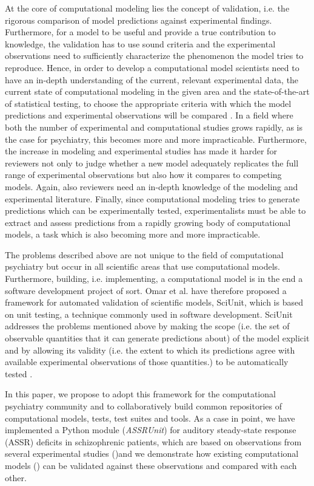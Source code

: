 \documentclass[a4paper,10pt]{article}
\begin{document}
At the core of computational modeling lies the concept of validation, i.e. the rigorous comparison of model predictions 
against experimental findings. Furthermore, for a model to be useful and provide a true contribution to knowledge, the validation has to 
use sound criteria and the experimental observations need to sufficiently characterize the phenomenon the model tries to reproduce.
Hence, in order to develop a computational model scientists need to have an in-depth understanding of the current, relevant experimental data, 
the current state of computational modeling in the given area and the state-of-the-art of statistical testing, to choose the appropriate criteria
with which the model predictions and experimental observations will be compared \cite{Gerkin2013,Sarma2016}. In a field where both the number of experimental 
and computational
studies grows rapidly, as is the case for psychiatry, this becomes more and more impracticable.
Furthermore, the increase in modeling and experimental studies has made it harder for reviewers not only to judge whether a new model adequately 
replicates the full range of experimental observations but also how it compares to competing models. Again, also reviewers need an 
in-depth knowledge of the modeling
and experimental literature.
Finally, since computational modeling tries to generate predictions which can be experimentally tested, experimentalists must be able 
to extract and assess predictions from a rapidly growing body of computational models, a task which is also becoming more and more impracticable.

The problems described above are not unique to the field of computational psychiatry but occur in all scientific areas that use computational models.
Furthermore, building, i.e. implementing, a computational model is in the end a software development project of sort. Omar et al. \cite{Omar2014}
have therefore
proposed a framework for automated validation of scientific models, SciUnit, which is based on unit testing, a technique commonly used in software 
development.
SciUnit addresses the problems mentioned above by making the scope (i.e. the set of observable
quantities that it can generate predictions about) of the model explicit and by allowing its validity (i.e. the extent to which its predictions
agree with available experimental observations of those quantities.) to be automatically tested \cite{Omar2014}.

In this paper, we  propose to adopt this framework for the computational psychiatry community and to collaboratively build
common repositories of computational models, tests, test suites and tools.
As a case in point, we have implemented a Python module (\textit{ASSRUnit}) for auditory steady-state response (ASSR) deficits in schizophrenic patients, which are based on 
observations from
several experimental studies (\cite{Krishnan2009,Vierling2008,Kwon1999})and we demonstrate
how existing computational models (\cite{Metzner2016,Beeman2013,Vierling2008,Metzner2017}) can be validated against these observations and compared with each 
other.
\end{document}
